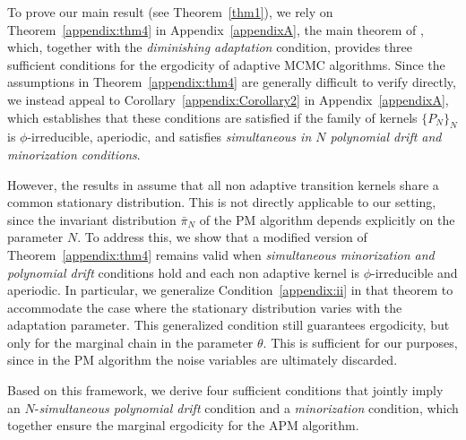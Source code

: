 \documentclass[pdflatex,sn-mathphys-num]{sn-jnl}
\theoremstyle{thmstyleone}
\theoremstyle{thmstyletwo}
\theoremstyle{thmstylethree}
\begin{document}
To prove our main result (see Theorem~\ref{thm1}), we rely on Theorem~\ref{appendix:thm4} in Appendix~\ref{appendixA}, the main theorem of \cite{atchade_limit_2010}, which, together with the \textit{diminishing adaptation} condition, provides three sufficient conditions for the ergodicity of adaptive MCMC algorithms. Since the assumptions in Theorem~\ref{appendix:thm4} are generally difficult to verify directly, we instead appeal to Corollary~\ref{appendix:Corollary2} in Appendix~\ref{appendixA}, which establishes that these conditions are satisfied if the family of kernels $\{P_N\}_{N}$ is $\phi$-irreducible, aperiodic, and satisfies \textit{simultaneous in $N$ polynomial drift and minorization conditions}.

However, the results in \cite{atchade_limit_2010} assume that all non adaptive transition kernels share a common stationary distribution. This is not directly applicable to our setting, since the invariant distribution $\bar\pi_N$ of the PM algorithm depends explicitly on the parameter $N$. To address this, we show that a modified version of Theorem~\ref{appendix:thm4} remains valid when \textit{simultaneous minorization and polynomial drift} conditions hold and each non adaptive kernel is $\phi$-irreducible and aperiodic. In particular, we generalize Condition~\eqref{appendix:ii} in that theorem to accommodate the case where the stationary distribution varies with the adaptation parameter. This generalized condition still guarantees ergodicity, but only for the marginal chain in the parameter $\theta$. This is sufficient for our purposes, since in the PM algorithm the noise variables are ultimately discarded.

Based on this framework, we derive four sufficient conditions that jointly imply an $N$-\textit{simultaneous polynomial drift} condition and a \textit{minorization} condition, which together ensure the marginal ergodicity for the APM algorithm.
\end{document}
